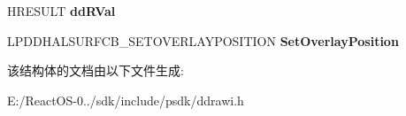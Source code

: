 \begin{DoxyCompactItemize}
\item 
\mbox{\label{struct___d_d_h_a_l___s_e_t_o_v_e_r_l_a_y_p_o_s_i_t_i_o_n_d_a_t_a_a90a894c33141f383f7476bbd89d809ee}} 
H\+R\+E\+S\+U\+LT {\bfseries dd\+R\+Val}
\item 
\mbox{\label{struct___d_d_h_a_l___s_e_t_o_v_e_r_l_a_y_p_o_s_i_t_i_o_n_d_a_t_a_a34ebac0f19f5fcc0839dd8d100a2d969}} 
L\+P\+D\+D\+H\+A\+L\+S\+U\+R\+F\+C\+B\+\_\+\+S\+E\+T\+O\+V\+E\+R\+L\+A\+Y\+P\+O\+S\+I\+T\+I\+ON {\bfseries Set\+Overlay\+Position}
\end{DoxyCompactItemize}


该结构体的文档由以下文件生成\+:\begin{DoxyCompactItemize}
\item 
E\+:/\+React\+O\+S-\/0../sdk/include/psdk/ddrawi.\+h\end{DoxyCompactItemize}
